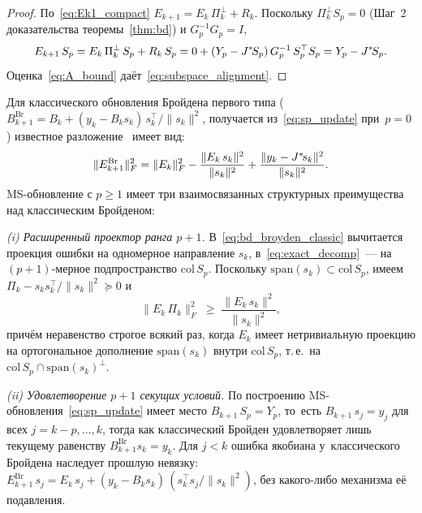 \begin{proof}
По~\eqref{eq:Ek1_compact} $E_{k+1} = E_k\,\Pi_k^\perp + R_k$. Поскольку
$\Pi_k^\perp S_p = 0$ (Шаг~2 доказательства теоремы~\ref{thm:bd}) и
$G_p^{-1} G_p = I$,
\[
  E_{k+1}\,S_p
  = E_k\,\Pi_k^\perp\,S_p + R_k\,S_p
  = 0 + (Y_p - J^{*}\!S_p)\,G_p^{-1}\,S_p^\top S_p
  = Y_p - J^{*}\!S_p.
\]
Оценка~\eqref{eq:A_bound} даёт~\eqref{eq:subspace_alignment}.
\end{proof}


\begin{remark}\label{rem:comparison}
Для классического обновления Бройдена первого типа
($B_{k+1}^{\mathrm{Br}} = B_k + (y_k - B_k s_k)\,s_k^\top/\|s_k\|^2$,
получается из~\eqref{eq:sp_update} при~$p=0$) известное
разложение~\cite[Lemma 8.2.1]{dennis1996} имеет вид:
\begin{equation}\label{eq:bd_broyden_classic}
  \|E_{k+1}^{\mathrm{Br}}\|_F^2
  = \|E_k\|_F^2 - \frac{\|E_k\,s_k\|^2}{\|s_k\|^2}
    + \frac{\|y_k - J^{*}\!s_k\|^2}{\|s_k\|^2}.
\end{equation}
MS-обновление с $p\ge 1$ имеет три взаимосвязанных структурных
преимущества над классическим Бройденом:

\smallskip
\noindent\textit{(i) Расширенный проектор ранга $p{+}1$.}
В~\eqref{eq:bd_broyden_classic} вычитается проекция ошибки на
одномерное направление $s_k$, в~\eqref{eq:exact_decomp}~--- на
$(p{+}1)$-мерное подпространство $\mathrm{col}\,S_p$. Поскольку
$\mathrm{span}(s_k)\subset\mathrm{col}\,S_p$, имеем
$\Pi_k - s_k s_k^\top/\|s_k\|^2 \succeq 0$ и
\begin{equation}\label{eq:neg-term-dominance}
  \|E_k\,\Pi_k\|_F^2 \;\ge\; \frac{\|E_k\,s_k\|^2}{\|s_k\|^2},
\end{equation}
причём неравенство строгое всякий раз, когда $E_k$ имеет нетривиальную
проекцию на ортогональное дополнение $\mathrm{span}(s_k)$ внутри
$\mathrm{col}\,S_p$, т.\,е.\ на
$\mathrm{col}\,S_p\cap\mathrm{span}(s_k)^\perp$.

\smallskip
\noindent\textit{(ii) Удовлетворение $p{+}1$ секущих условий.}
По построению MS-обновления~\eqref{eq:sp_update} имеет место
$B_{k+1}\,S_p = Y_p$, то~есть $B_{k+1}\,s_j = y_j$ для всех
$j = k{-}p,\ldots,k$, тогда как классический Бройден удовлетворяет лишь
текущему равенству $B_{k+1}^{\mathrm{Br}} s_k = y_k$. Для $j < k$ ошибка
якобиана у~классического Бройдена наследует прошлую невязку:
$E_{k+1}^{\mathrm{Br}}\,s_j = E_k\,s_j +
(y_k - B_k s_k)\,(s_k^\top s_j/\|s_k\|^2)$,
без какого-либо механизма её подавления.


\end{remark}

